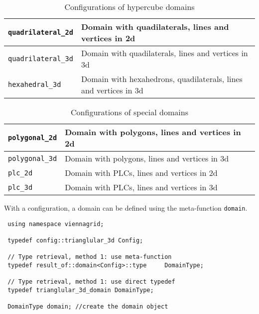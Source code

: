\begin{table}[tb]
  \begin{center}
    \begin{tabular}{|l|l|}
      \hline
      \lstinline|quadrilateral_2d|   &  Domain with quadilaterals, lines and vertices in 2d  \\
      \hline
      \lstinline|quadrilateral_3d|   &  Domain with quadilaterals, lines and vertices in 3d  \\
      \hline
      \lstinline|hexahedral_3d|   &  Domain with hexahedrons, quadilaterals, lines and vertices in 3d  \\
      \hline 
    \end{tabular}
    \caption{Configurations of hypercube domains}
    \label{tab:configs-hypercube}
  \end{center}
\end{table}


\begin{table}[tb]
  \begin{center}
    \begin{tabular}{|l|l|}
      \hline
      \lstinline|polygonal_2d|   &  Domain with polygons, lines and vertices in 2d  \\
      \hline
      \lstinline|polygonal_3d|   &  Domain with polygons, lines and vertices in 3d  \\
      \hline
      \lstinline|plc_2d|   &  Domain with PLCs, lines and vertices in 2d  \\
      \hline 
      \lstinline|plc_3d|   &  Domain with PLCs, lines and vertices in 3d  \\
      \hline 
    \end{tabular}
    \caption{Configurations of special domains}
    \label{tab:configs-special}
  \end{center}
\end{table}

With a configuration, a domain can be defined using the meta-function \lstinline|domain|.

\begin{lstlisting}
 using namespace viennagrid;

 typedef config::trianglular_3d Config;
 
 // Type retrieval, method 1: use meta-function
 typedef result_of::domain<Config>::type     DomainType;
 
 // Type retrieval, method 1: use direct typedef
 typedef trianglular_3d_domain DomainType;

 DomainType domain; //create the domain object
\end{lstlisting}

